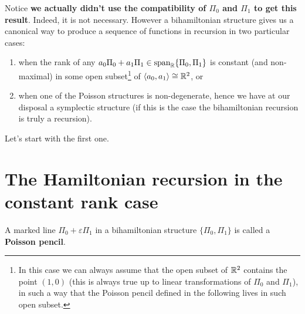 \documentclass[main.tex]{subfiles}
\begin{document}
Notice \textbf{we actually didn't use the compatibility of $\Pi_0$ and $\Pi_1$ to get this result}. Indeed, it is not necessary. However a bihamiltonian structure gives us a canonical way to produce a sequence of functions in recursion in two particular cases:

\begin{enumerate}
	\item when the rank of any $a_0\Pi_0 + a_1\Pi_1 \in \operatorname{span}_{\mathbb{R}} \{\Pi_0, \Pi_1\}$ is constant (and non-maximal) in some open subset\footnote{In this case we can always assume that the open subset of $\mathbb{R}^2$ contains the point $(1, 0)$ (this is always true up to linear transformations of $\Pi_0$ and $\Pi_1$), in such a way that the Poisson pencil defined in the following lives in such open subset.} of $\langle a_0, a_1\rangle \overset{}{\cong} \mathbb{R}^2$, or
	\item when one of the Poisson structures is non-degenerate, hence we have at our disposal a symplectic structure (if this is the case the bihamiltonian recursion is truly a recursion).
\end{enumerate}

Let's start with the first one.

\section{The Hamiltonian recursion in the constant rank case}
\begin{definition}
	A marked line $\Pi_0 + \varepsilon \Pi_1$ in a bihamiltonian structure $\{\Pi_0, \Pi_1\}$ is called a \textbf{Poisson pencil}.
\end{definition}
\end{document}
